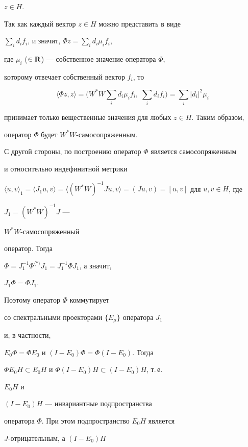 $z\in H$.





Так как каждый вектор $z\in H$ можно представить в виде


$\sum\limits_i d_if_i$, и значит, $\Phi z=\sum\limits_i d_i\mu_if_i$,


где $\mu_i$ ($\in \bold R$) --- собственное значение оператора $\Phi$,


которому отвечает собственный вектор $f_i$, то


$$


\langle\Phi z,z\rangle=\Bigr(W^*W\sum_i d_i\mu_if_i, \;


\sum_i d_if_i\Bigr)=\sum_i|d_i|^2\mu_i


$$


принимает только вещественные значения для любых $z\in H$. Таким образом,


оператор $\Phi$ будет $W^*W$-самосопряженным.





С другой стороны, по построению оператор $\Phi$ является самосопряженным


и относительно индефинитной метрики


$\langle u,v\rangle_1=\langle J_1u,v\rangle=


\langle(W^*W)^{-1}Ju,v\rangle=(Ju,v)=[u,v]$ для $u,v\in H$, где


$J_1=(W^*W)^{-1}J$ ---


$W^*W$-самосопряженный


оператор. Тогда


$\Phi=J_1^{-1}\Phi^{\langle *\rangle}J_1=J_1^{-1}\Phi J_1$, а значит,


$J_1\Phi=\Phi J_1$.


Поэтому оператор $\Phi$ коммутирует


со спектральными проекторами $\{E_\mu\}$ оператора $J_1$


и, в частности,


$E_0\Phi=\Phi E_0$ и $(I-E_0)\Phi=\Phi(I-E_0)$. Тогда


$\Phi E_0H\subset E_0H$ и $\Phi(I-E_0)H\subset(I-E_0)H$, т.\,е.


$E_0H$ и


$(I-E_0)H$ --- инвариантные подпространства


оператора $\Phi$. При этом подпространство $E_0H$ является


$J$-отрицательным, а $(I-E_0)H$


